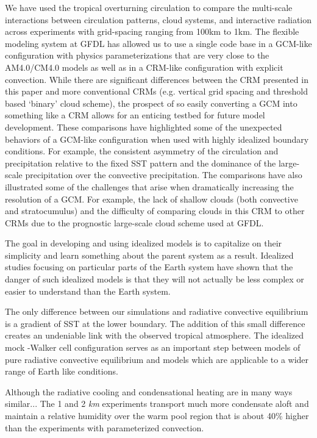 \documentclass[11pt]{article}   	%
\begin{document}
We have used the tropical overturning circulation to compare the multi-scale interactions between circulation patterns, cloud 
systems, and interactive radiation across experiments with grid-spacing ranging from 100km to 1km.  The flexible modeling
system at GFDL has allowed us to use a single code base in a GCM-like configuration with physics parameterizations 
that are very close to the AM4.0/CM4.0 models as well as in a CRM-like configuration with explicit convection.  While 
there are significant differences between the CRM presented in this paper and more conventional CRMs (e.g. vertical 
grid spacing and threshold based `binary' cloud scheme), the prospect of so easily converting a GCM into something 
like a CRM allows for an enticing testbed for future model development.
These comparisons have highlighted some of the unexpected behaviors of a GCM-like configuration when used with 
highly idealized boundary conditions.  For example, the consistent asymmetry of the circulation and precipitation relative 
to the fixed SST pattern and the dominance of the large-scale precipitation over the convective precipitation.  
The comparisons have also illustrated some 
of the challenges that arise when dramatically increasing the resolution of a GCM.  For example, the lack of shallow 
clouds (both convective and stratocumulus) and the difficulty of comparing clouds in this CRM to other CRMs due to the 
prognostic large-scale cloud scheme used at GFDL.

The goal in developing and using idealized models is to capitalize on their simplicity and learn something about the 
parent system as a result.  Idealized studies focusing on particular parts of the Earth system have shown that the danger of 
such idealized models is that they will not actually be less complex or easier to understand than the Earth system.  

The only difference between our simulations and radiative convective equilibrium is a gradient of SST at the lower boundary.
The addition of this small difference creates an undeniable link with the observed tropical atmosphere.  The idealized 
mock -Walker cell configuration serves as an important step between models of pure radiative convective equilibrium
and models which are applicable to a wider range of Earth like conditions.  


Although the radiative cooling and condensational heating
 are in many ways similar...   The 1 and 2 \textit{km} experiments transport much more condensate aloft and maintain a 
 relative humidity over the warm pool region that is about 40\% higher than the experiments with parameterized convection.
\end{document}
